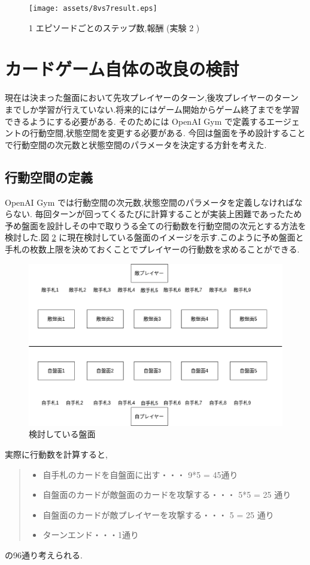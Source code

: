 \documentclass{jarticle}     %
\begin{document}
\begin{figure}[htbp]
  \centering
  \texttt{[image: assets/8vs7result.eps]}
  \caption{ 1 エピソードごとのステップ数,報酬 (実験 2 )}
  \label{fig:8vs7result}
\end{figure}

\section{カードゲーム自体の改良の検討}
現在は決まった盤面において先攻プレイヤーのターン,後攻プレイヤーのターンまでしか学習が行えていない.将来的にはゲーム開始からゲーム終了までを学習できるようにする必要がある.
そのためには OpenAI Gym で定義するエージェントの行動空間,状態空間を変更する必要がある.
今回は盤面を予め設計することで行動空間の次元数と状態空間のパラメータを決定する方針を考えた.

\subsection{行動空間の定義}
OpenAI Gym では行動空間の次元数,状態空間のパラメータを定義しなければならない. 毎回ターンが回ってくるたびに計算することが実装上困難であったため予め盤面を設計しその中で取りうる全ての行動数を行動空間の次元とする方法を検討した.図 \ref{fig:idea} に現在検討している盤面のイメージを示す.このように予め盤面と手札の枚数上限を決めておくことでプレイヤーの行動数を求めることができる.

\begin{figure}[htbp]
  \centering
  \includegraphics[width=150mm]{assets/idea.eps}
  \caption{ 検討している盤面}
  \label{fig:idea}
\end{figure}
実際に行動数を計算すると,
\begin{quote}
  \begin{itemize}
   \item 自手札のカードを自盤面に出す・・・  9*5 = 45通り
   \item 自盤面のカードが敵盤面のカードを攻撃する・・・ 5*5 = 25 通り
   \item 自盤面のカードが敵プレイヤーを攻撃する・・・ 5 = 25 通り
   \item ターンエンド・・・1通り
  \end{itemize}
 \end{quote}
の96通り考えられる.
\end{document}
